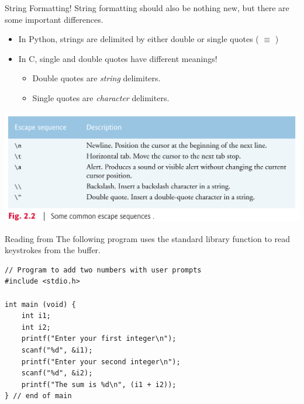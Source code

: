 \documentclass[11pt]{beamer}
\let\OldTexttt\texttt
\renewcommand{\texttt}[1]{\OldTexttt{\color{teal}{#1}}}
\begin{document}
\begin{frame}{String Formatting!}
String formatting should also be nothing new, but there are some important differences.
\begin{itemize}
\item In Python, strings are delimited by either double or single quotes (\texttt{"Hello World"} $\equiv$ \texttt{'Hello World'})
\item In C, single and double quotes have different meanings! 
\begin{itemize}
\item Double quotes are \emph{string} delimiters.
\item Single quotes are \emph{character} delimiters.
\end{itemize}
\end{itemize}
\includegraphics[scale=0.14]{escape.png}
\end{frame}

\begin{frame}[fragile=singleslide]{Reading from \texttt{stdin}}
The following program uses the \texttt{scanf} standard library function to read keystrokes from the \texttt{stdin} buffer.
\begin{lstlisting}[style=C]
// Program to add two numbers with user prompts
#include <stdio.h>

int main (void) { 
	int i1;
	int i2;
	printf("Enter your first integer\n");
	scanf("%d", &i1);
	printf("Enter your second integer\n");
	scanf("%d", &i2);
	printf("The sum is %d\n", (i1 + i2));
} // end of main
\end{lstlisting}
\end{frame}

\end{document}
